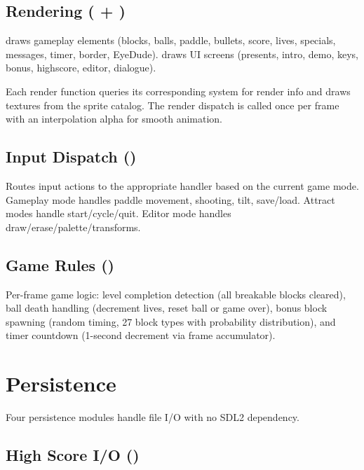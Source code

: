\documentclass[11pt,a4paper]{article}
\begin{document}
\subsection{Rendering ( + )}
\label{sec:rendering}

 draws gameplay elements (blocks, balls, paddle, bullets, score, lives, specials, messages, timer, border, EyeDude).  draws UI screens (presents, intro, demo, keys, bonus, highscore, editor, dialogue).

Each render function queries its corresponding system for render info and draws textures from the sprite catalog. The render dispatch is called once per frame with an interpolation alpha for smooth animation.

\subsection{Input Dispatch ()}
\label{sec:input-dispatch}

Routes input actions to the appropriate handler based on the current game mode. Gameplay mode handles paddle movement, shooting, tilt, save/load. Attract modes handle start/cycle/quit. Editor mode handles draw/erase/palette/transforms.

\subsection{Game Rules ()}
\label{sec:game-rules}

Per-frame game logic: level completion detection (all breakable blocks cleared), ball death handling (decrement lives, reset ball or game over), bonus block spawning (random timing, 27 block types with probability distribution), and timer countdown (1-second decrement via frame accumulator).


\section{Persistence}
\label{sec:persistence}

Four persistence modules handle file I/O with no SDL2 dependency.

\subsection{High Score I/O ()}
\label{sec:highscore-io}
\end{document}
